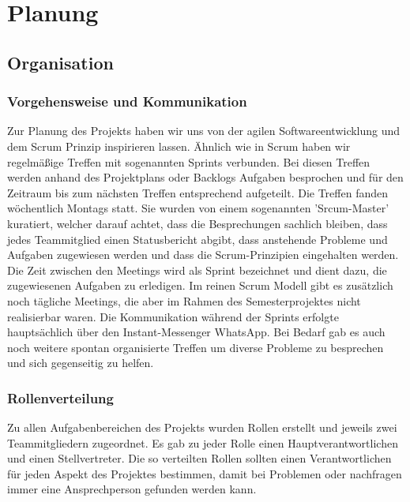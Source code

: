 \chapter{Planung}
\section{Organisation}
\subsection{Vorgehensweise und Kommunikation}
Zur Planung des Projekts haben wir uns von der agilen Softwareentwicklung und dem Scrum Prinzip inspirieren lassen. Ähnlich wie in Scrum haben wir regelmäßige Treffen mit sogenannten Sprints verbunden. Bei diesen Treffen werden anhand des Projektplans oder Backlogs Aufgaben besprochen und für den Zeitraum bis zum nächsten Treffen entsprechend aufgeteilt. Die Treffen fanden wöchentlich Montags statt. Sie wurden von einem sogenannten 'Srcum-Master' kuratiert, welcher darauf achtet, dass die Besprechungen sachlich bleiben, dass jedes Teammitglied einen Statusbericht abgibt, dass anstehende Probleme und Aufgaben zugewiesen werden und dass die Scrum-Prinzipien eingehalten werden. Die Zeit zwischen den Meetings wird als Sprint bezeichnet und dient dazu, die zugewiesenen Aufgaben zu erledigen. Im reinen Scrum Modell gibt es zusätzlich noch tägliche Meetings, die aber im Rahmen des Semesterprojektes nicht realisierbar waren. Die Kommunikation während der Sprints erfolgte hauptsächlich über den Instant-Messenger WhatsApp. Bei Bedarf gab es auch noch weitere spontan organisierte Treffen um diverse Probleme zu besprechen und sich gegenseitig zu helfen. 

\subsection{Rollenverteilung}
Zu allen Aufgabenbereichen des Projekts wurden Rollen erstellt und jeweils zwei Teammitgliedern zugeordnet. Es gab zu jeder Rolle einen Hauptverantwortlichen und einen Stellvertreter. Die so verteilten Rollen sollten einen Verantwortlichen für jeden Aspekt des Projektes bestimmen, damit bei Problemen oder nachfragen immer eine Ansprechperson gefunden werden kann.

